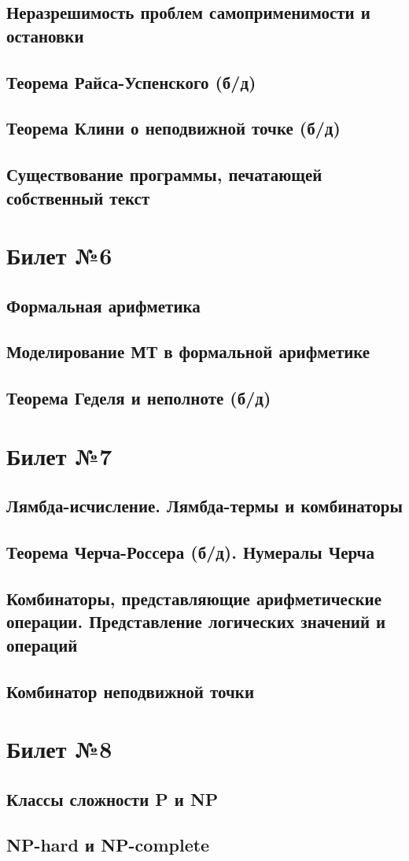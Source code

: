 \documentclass[a4paper]{article}
\theoremstyle{plain}
\theoremstyle{remark}
\theoremstyle{definition}
\begin{document}
\subsection{Неразрешимость проблем самоприменимости и остановки}
\subsection{Теорема Райса-Успенского (б/д)}
\subsection{Теорема Клини о неподвижной точке (б/д)}
\subsection{Существование программы, печатающей собственный текст}

\section{Билет №6}
\subsection{Формальная арифметика}
\subsection{Моделирование МТ в формальной арифметике}
\subsection{Теорема Геделя и неполноте (б/д)}

\section{Билет №7}
\subsection{Лямбда-исчисление. Лямбда-термы и комбинаторы}
\subsection{Теорема Черча-Россера (б/д). Нумералы Черча}
\subsection{Комбинаторы, представляющие арифметические операции. Представление логических значений и операций}
\subsection{Комбинатор неподвижной точки}

\section{Билет №8}
\subsection{Классы сложности P и NP}
\subsection{NP-hard и NP-complete}
\end{document}
